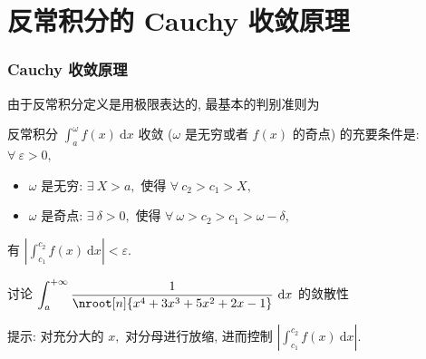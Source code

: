 
\section{反常积分的 Cauchy 收敛原理}


\begin{frame}
\frametitle{Cauchy 收敛原理}

由于反常积分定义是用极限表达的, 最基本的判别准则为

\begin{thm}
反常积分 $\displaystyle \int_a^{\omega} f(x) ~ \mathrm{d} x$ 收敛 ($\omega$ 是无穷或者 $f(x)$ 的奇点) 的充要条件是: $\forall~\varepsilon > 0,$
\begin{itemize}
\item $\omega$ 是无穷: $\exists ~ X > a,$ 使得 $\forall~c_2 > c_1 > X,$
\item $\omega$ 是奇点: $\exists ~ \delta > 0,$ 使得 $\forall~\omega > c_2 > c_1 > \omega - \delta,$
\end{itemize}
有 $\displaystyle \left| \int_{c_1}^{c_2} f(x) ~ \mathrm{d}x \right| < \varepsilon.$
\end{thm}

\pause


\begin{eg}
讨论 $\displaystyle \int_a^{+\infty} \dfrac{1}{\nroot[n]{x^4 + 3x^3 + 5x^2 + 2x - 1}} ~ \mathrm{d} x$ 的敛散性
\end{eg}

\alert{提示:} 对充分大的 $x,$ 对分母进行放缩, 进而控制 $\displaystyle \left| \int_{c_1}^{c_2} f(x) ~ \mathrm{d}x \right|.$

\end{frame}


